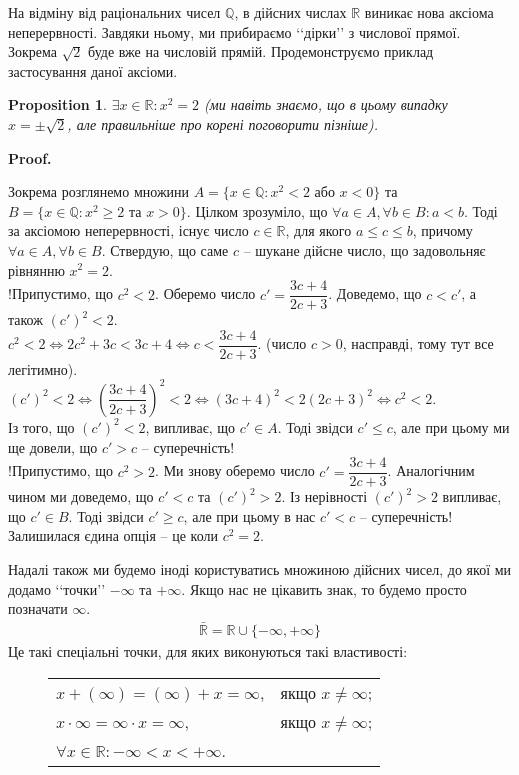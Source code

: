 \documentclass[a4paper, 14pt]{article}
\makeatletter
\def\qed{$\blacksquare$}
\theoremstyle{theoremdd}
\theoremstyle{theoremdd}
\theoremstyle{theoremdd}
\theoremstyle{theoremdd}
\theoremstyle{theoremdd}
\newtheorem{proposition}[theorem]{Proposition}
\theoremstyle{theoremdd}
\theoremstyle{theoremdd}
\theoremstyle{theoremdd}
\renewenvironment{proof}[1][Proof.\\]{\par
\pushQED{\hfill \qed}%
\normalfont \topsep6\p@\@plus6\p@\relax
\trivlist
\item\relax
{\bfseries
#1\@addpunct{.}}\hspace\labelsep\ignorespaces
}{%
\popQED\endtrivlist\@endpefalse
}
\makeatother
\begin{document}
	На відміну від раціональних чисел $\mathbb{Q}$, в дійсних числах $\mathbb{R}$ виникає нова аксіома неперервності. Завдяки ньому, ми прибираємо \lq\lq дірки\rq\rq \text{} з числової прямої. Зокрема $\sqrt{2}$ буде вже на числовій прямій. Продемонструємо приклад застосування даної аксіоми.
	
	\begin{proposition}
	$\exists x \in \mathbb{R}: x^2 = 2$ (ми навіть знаємо, що в цьому випадку $x = \pm \sqrt{2}$, але правильніше про корені поговорити пізніше).
	\end{proposition}
	
	\begin{proof}
	Зокрема розглянемо множини $A = \{x \in \mathbb{Q}: x^2 < 2 \text{ або } x < 0\}$ та $B = \{x \in \mathbb{Q}: x^2 \geq 2 \text{ та } x > 0\}$. Цілком зрозуміло, що $\forall a \in A, \forall b \in B: a < b$. Тоді за аксіомою неперервності, існує число $c \in \mathbb{R}$, для якого $a \leq c \leq b$, причому $\forall a \in A, \forall b \in B$. Ствердую, що саме $c$ -- шукане дійсне число, що задовольняє рівнянню $x^2 = 2$.\\
	!Припустимо, що $c^2 < 2$. Оберемо число $c' = \dfrac{3c+4}{2c+3}$. Доведемо, що $c < c'$, а також $(c')^2 < 2$.\\
	$c^2 < 2 \iff 2c^2 + 3c < 3c + 4 \iff c < \dfrac{3c+4}{2c+3}$. (число $c > 0$, насправді, тому тут все легітимно).\\
	$(c')^2 < 2 \iff \left( \dfrac{3c+4}{2c+3} \right)^2 < 2 \iff (3c+4)^2 < 2(2c+3)^2 \iff c^2 < 2$.\\
	Із того, що $(c')^2 < 2$, випливає, що $c' \in A$. Тоді звідси $c' \leq c$, але при цьому ми ще довели, що $c' > c$ -- суперечність!\\
	!Припустимо, що $c^2 > 2$. Ми знову оберемо число $c' = \dfrac{3c+4}{2c+3}$. Аналогічним чином ми доведемо, що $c' < c$ та $(c')^2 > 2$. Із нерівності $(c')^2 > 2$ випливає, що $c' \in B$. Тоді звідси $c' \geq c$, але при цьому в нас $c' < c$ -- суперечність!\\
	Залишилася єдина опція -- це коли $c^2 = 2$.
	\end{proof}
	
	Надалі також ми будемо іноді користуватись множиною дійсних чисел, до якої ми додамо \lq\lq точки\rq\rq \text{} $-\infty$ та $+\infty$. Якщо нас не цікавить знак, то будемо просто позначати $\infty$.
	\begin{align*}
	\bar{\mathbb{R}} = \mathbb{R} \cup \{-\infty, +\infty\}
	\end{align*}
	Це такі спеціальні точки, для яких виконуються такі властивості:
	\begin{figure}[H]
	\centering
	\begin{tabular}{ll}
	$x + (\infty) = (\infty) + x = \infty$, & якщо $x \neq \infty$;\\
	$x \cdot \infty = \infty \cdot x = \infty$, & якщо $x \neq \infty$;\\
	$\forall x \in \mathbb{R}: -\infty < x < +\infty$. &
	\end{tabular}
	\end{figure}
\end{document}
